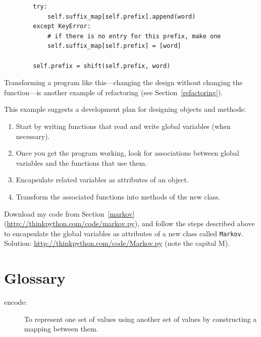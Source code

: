 \documentclass[10pt]{book}
\begin{document}
\begin{CJK}{UTF8}{gbsn}
\begin{verbatim}
        try:
            self.suffix_map[self.prefix].append(word)
        except KeyError:
            # if there is no entry for this prefix, make one
            self.suffix_map[self.prefix] = [word]

        self.prefix = shift(self.prefix, word)        
\end{verbatim}

Transforming a program like this---changing the design without
changing the function---is another example of refactoring
(see Section~\ref{refactoring}).

This example suggests a development plan for designing objects and
methods:

\begin{enumerate}

\item Start by writing functions that read and write global
variables (when necessary).

\item Once you get the program working, look for associations
between global variables and the functions that use them.

\item Encapsulate related variables as attributes of an object.

\item Transform the associated functions into methods of the new
class.

\end{enumerate}


\begin{exercise}

Download my code from Section~\ref{markov}
(\url{http://thinkpython.com/code/markov.py}), and follow the steps described
above to encapsulate the global variables as attributes of a new class
called {\tt Markov}.  Solution: \url{http://thinkpython.com/code/Markov.py}
(note the capital M).

\end{exercise}




\section{Glossary}

\begin{description}

\item[encode:]  To represent one set of values using another
set of values by constructing a mapping between them.


\end{description}
\end{CJK}
\end{document}
